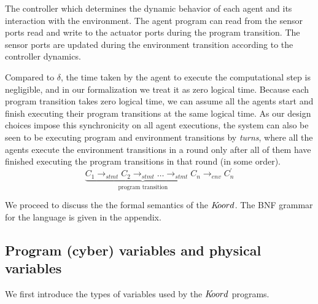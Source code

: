 The controller which determines the dynamic behavior of each agent and its interaction with the environment. The agent program can read from the sensor ports read and write to the actuator ports during the program transition. The sensor ports are updated during the environment transition according to the controller dynamics. 


Compared to $\delta$, the time taken by the agent to execute the computational step is negligible, and in our formalization we treat it as zero logical time. Because each program transition takes zero logical time, we can assume all the agents start and finish executing their program transitions at the same logical time. As our design choices impose this synchronicity on all agent executions, the system can also be seen to be executing program and environment transitions by \emph{turns}, where all the agents execute the environment transitions in a round only after all of them have finished executing the program transitions in that round (in some order). 
$$
\underbrace{C_1\rightarrow_{stmt} C_2\rightarrow_\mathit{stmt}\ldots \rightarrow_{stmt}C_n}_{\mbox{program transition}}\rightarrow_\mathit{env} C^\prime_n
$$


We proceed to discuss the the formal semantics of the $K\kern-2pt oord$. The BNF grammar for the language is given in the appendix.
 
\subsection{Program (cyber) variables and physical variables}
\label{sec:variables}
We first introduce the types of variables used by the $K\kern-2pt oord$ programs. 

